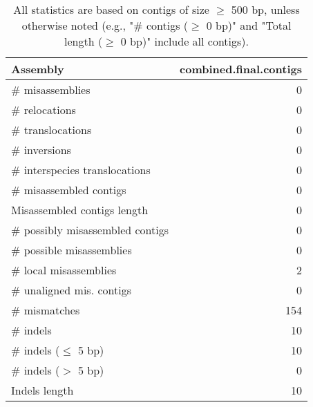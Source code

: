 \documentclass[12pt,a4paper]{article}
\begin{document}
\begin{table}[ht]
\begin{center}
\caption{All statistics are based on contigs of size $\geq$ 500 bp, unless otherwise noted (e.g., "\# contigs ($\geq$ 0 bp)" and "Total length ($\geq$ 0 bp)" include all contigs).}
\begin{tabular}{|l*{1}{|r}|}
\hline
Assembly & combined.final.contigs \\ \hline
\# misassemblies & 0 \\ \hline
\hspace{5mm}\# relocations & 0 \\ \hline
\hspace{5mm}\# translocations & 0 \\ \hline
\hspace{5mm}\# inversions & 0 \\ \hline
\hspace{5mm}\# interspecies translocations & 0 \\ \hline
\# misassembled contigs & 0 \\ \hline
Misassembled contigs length & 0 \\ \hline
\# possibly misassembled contigs & 0 \\ \hline
\hspace{5mm}\# possible misassemblies & 0 \\ \hline
\# local misassemblies & 2 \\ \hline
\# unaligned mis. contigs & 0 \\ \hline
\# mismatches & 154 \\ \hline
\# indels & 10 \\ \hline
\hspace{5mm}\# indels ($\leq$ 5 bp) & 10 \\ \hline
\hspace{5mm}\# indels ($>$ 5 bp) & 0 \\ \hline
Indels length & 10 \\ \hline
\end{tabular}
\end{center}
\end{table}
\end{document}
